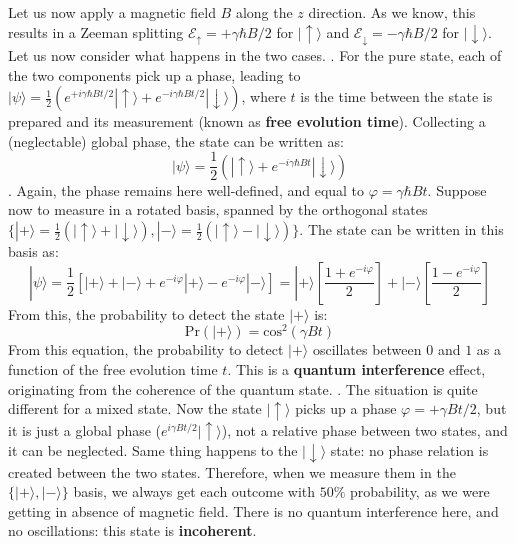 \documentclass[a4paper,11pt]{article}
\newcommand{\ket}[1]{| #1 \rangle}
\begin{document}
Let us now apply a magnetic field $B$ along the $z$ direction. As we know, this results in a Zeeman splitting $\mathcal{E}_{\uparrow} = +\gamma \hbar B/2$ for $\ket{\uparrow}$ and $\mathcal{E}_{\downarrow} = -\gamma \hbar B/2$ for $\ket{\downarrow}$. Let us now consider what happens in the two cases.
. For the pure state, each of the two components pick up a phase, leading to $\ket{\psi} = \frac{1}{2} (e^{+i \gamma \hbar B t/2} \ket{\uparrow}+e^{-i \gamma \hbar B t/2} \ket{\downarrow})$, where $t$ is the time between the state is prepared and its measurement (known as {\bf free evolution time}). Collecting a (neglectable) global phase, the state can be written as:
\begin{equation}
\ket{\psi} = \frac{1}{2} ( \ket{\uparrow}+e^{-i \gamma \hbar B t} \ket{\downarrow})
\end{equation}. Again, the phase remains here well-defined, and equal to $\varphi = \gamma \hbar B t$. 
    \newline Suppose now to measure in a rotated basis, spanned by the orthogonal states $\lbrace \ket{+} = \frac{1}{2} ( \ket{\uparrow}+ \ket{\downarrow}), \ket{-} = \frac{1}{2} ( \ket{\uparrow}- \ket{\downarrow}) \rbrace$. The state can be written in this basis as:
    \begin{equation}
        \ket{\psi} = \frac{1}{2} \left [ \ket{+} + \ket{-} + e^{-i\varphi}\ket{+} - e^{-i\varphi}\ket{-} \right] = \ket{+} \left[ \frac{1 + e^{-i\varphi} }{2}\right] + \ket{-} \left[ \frac{1 - e^{-i\varphi} }{2}\right]
    \end{equation}
From this, the probability to detect the state $\ket{+}$ is:
\begin{equation}
    \mbox{Pr}(\ket{+}) = \mbox{cos}^2
\left( \gamma B t\right)
\end{equation}
From this equation, the probability to detect $\ket{+}$ oscillates between $0$ and $1$ as a function of the free evolution time $t$. This is a {\bf quantum interference} effect, originating from the coherence of the quantum state.
. The situation is quite different for a mixed state. Now the state $\ket{\uparrow}$ picks up a phase $\varphi = +\gamma B t/2$, but it is just a global phase ($e^{i\gamma B t/2}\ket{\uparrow}$), not a relative phase between two states, and it can be neglected. Same thing happens to the $\ket{\downarrow}$ state: no phase relation is created between the two states. Therefore, when we measure them in the $\lbrace \ket{+}, \ket{-} \rbrace$ basis, we always get each outcome with $50\%$ probability, as we were getting in absence of magnetic field. There is no quantum interference here, and no oscillations: this state is {\bf incoherent}.
\end{document}
